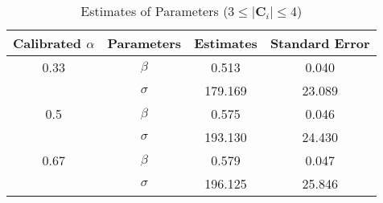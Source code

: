 \begin{table}[H]
    \centering
    \caption{Estimates of Parameters ($3 \leq |\mathbf{C}_i| \leq 4$)}
    \label{table: estimates (min_size=3 max_size=4 margin=2000)}
    \begin{tabular}{cccc}
        \toprule
        Calibrated $\alpha$ & Parameters & Estimates & Standard Error \\
        \midrule
        0.33                & $\beta$    & 0.513     & 0.040          \\
                            & $\sigma$   & 179.169   & 23.089         \\
        \midrule
        0.5                 & $\beta$    & 0.575     & 0.046          \\
                            & $\sigma$   & 193.130   & 24.430         \\
        \midrule
        0.67                & $\beta$    & 0.579     & 0.047          \\
                            & $\sigma$   & 196.125   & 25.846         \\
        \bottomrule
    \end{tabular}
\end{table}

